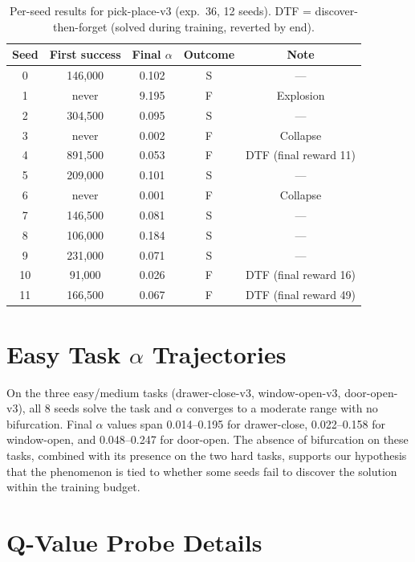 \documentclass[twocolumn]{article}
\begin{document}
\begin{table}[h]
\caption{Per-seed results for pick-place-v3 (exp.~36, 12 seeds).
DTF = discover-then-forget (solved during training, reverted by end).}
\label{tab:pick_seeds}
\centering
\small
\begin{tabular}{ccccc}
\toprule
Seed & First success & Final $\alpha$ & Outcome & Note \\
\midrule
0  & 146,000  & 0.102 & S & --- \\
1  & never    & 9.195 & F & Explosion \\
2  & 304,500  & 0.095 & S & --- \\
3  & never    & 0.002 & F & Collapse \\
4  & 891,500  & 0.053 & F & DTF (final reward 11) \\
5  & 209,000  & 0.101 & S & --- \\
6  & never    & 0.001 & F & Collapse \\
7  & 146,500  & 0.081 & S & --- \\
8  & 106,000  & 0.184 & S & --- \\
9  & 231,000  & 0.071 & S & --- \\
10 & 91,000   & 0.026 & F & DTF (final reward 16) \\
11 & 166,500  & 0.067 & F & DTF (final reward 49) \\
\bottomrule
\end{tabular}
\end{table}


\section{Easy Task $\alpha$ Trajectories}
\label{app:easy_tasks}

On the three easy/medium tasks (drawer-close-v3, window-open-v3,
door-open-v3), all 8 seeds solve the task and $\alpha$ converges to a
moderate range with no bifurcation. Final $\alpha$ values span 0.014--0.195
for drawer-close, 0.022--0.158 for window-open, and 0.048--0.247 for
door-open. The absence of bifurcation on these tasks, combined with its
presence on the two hard tasks, supports our hypothesis that the phenomenon
is tied to whether some seeds fail to discover the solution within the training
budget.


\section{Q-Value Probe Details}
\label{app:qvalues}
\end{document}
